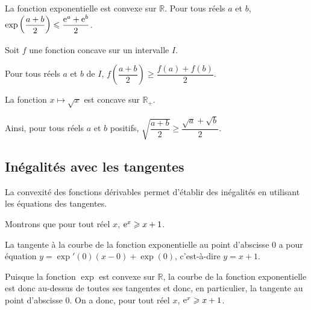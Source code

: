 \documentclass[11pt,fleqn, openany]{book} %
\begin{document}
\begin{example}La fonction exponentielle est convexe sur $\mathbb{R}$. Pour tous réels $a$ et $b$, $\exp\left(\dfrac{a+b}{2}\right) \leqslant \dfrac{\mathrm{e}^a+\mathrm{e}^b}{2}$.\end{example}

\begin{proposition}Soit $f$ une fonction concave sur un intervalle $I$. 

Pour tous réels $a$ et $b$ de $I$, $ f\left( \dfrac{a+b}{2} \right) \geqslant \dfrac{f(a)+f(b)}{2}$.
\end{proposition}

\begin{example}La fonction $x\mapsto \sqrt{x}$ est concave sur $\mathbb{R}_+$. 

Ainsi, pour tous réels $a$ et $b$ positifs, $\sqrt{\dfrac{a+b}{2}} \geqslant \dfrac{\sqrt{a}+\sqrt{b}}{2}$.\end{example}

\subsection{Inégalités avec les tangentes}

La convexité des fonctions dérivables permet d'établir des inégalités en utilisant les équations des tangentes.

\begin{example}Montrons que pour tout réel $x$, $\mathrm{e}^x\geqslant x+1$.

\begin{minipage}{0.6\linewidth}
La tangente à la courbe de la fonction exponentielle au point d'abscisse $0$ a pour équation $y=\exp'(0)(x-0)+\exp(0)$, c'est-à-dire $y=x+1$.

Puisque la fonction $\exp$ est convexe sur $\mathbb{R}$, la courbe de la fonction exponentielle est donc au-dessus de toutes ses tangentes et donc, en particulier, la tangente au point d'abscisse 0. On a donc, pour tout réel $x$, $\mathrm{e}^x \geqslant x+1$.

\end{minipage}\hfill\begin{minipage}{0.35\linewidth}

\begin{center}
\end{center}
\end{minipage}

\end{example}
\end{document}
